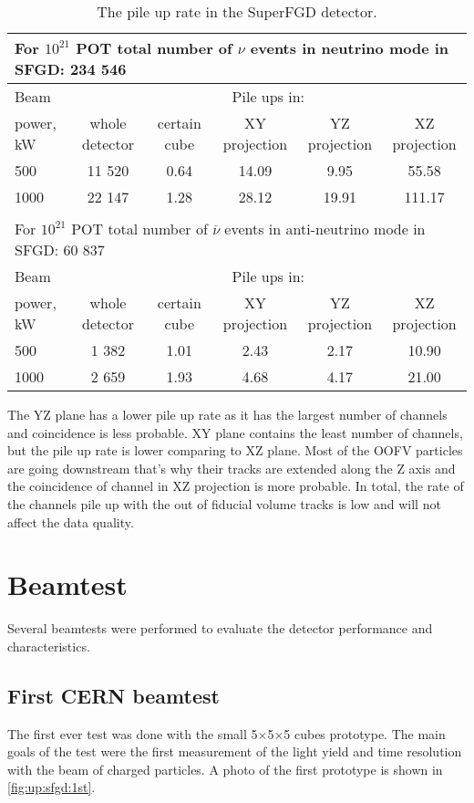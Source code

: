 \documentclass[main.tex]{subfiles}
\begin{document}
\begin{table}[!ht]
	\begin{tabular}{|l|ccccc|}
	\multicolumn{6}{l}{For $10^{21}$ POT total number of $\nu$ events in neutrino mode in  SFGD: 234 546} \\
	\hline
	Beam  					& \multicolumn{5}{c}{Pile ups in:} \\
	power, kW				& whole detector 	& certain cube 	& XY projection 	& YZ projection 	& XZ projection \\
	\hline
	500							& 11 520					& 0.64  				& 14.09					  & 9.95 						& 55.58 \\
	1000 						& 22 147 					& 1.28 					& 28.12 					& 19.91 					& 111.17 \\
	\hline
	\hline
	\multicolumn{6}{l}{} \\
	\multicolumn{6}{l}{For $10^{21}$ POT total number of $\overline{\nu}$ events in anti-neutrino mode in SFGD: 60 837} \\
	\hline
	Beam  					& \multicolumn{5}{c}{Pile ups in:} \\
	power, kW				& whole detector 	& certain cube 	& XY projection 	& YZ projection 	& XZ projection \\
	\hline
	500							&  1 382					& 1.01  				&  2.43					  & 2.17  					& 10.90 \\
	1000 						&  2 659 					& 1.93 					&  4.68 					& 4.17   					& 21.00 \\
	\hline
	\end{tabular}
	\caption{The pile up rate in the SuperFGD detector.}
	\label{tbl:up:sfgd:pile_up}
\end{table}

The YZ plane has a lower pile up rate as it has the largest number of channels and coincidence is less probable. XY plane contains the least number of channels, but the pile up rate is lower comparing to XZ plane. Most of the OOFV particles are going downstream that's why their tracks are extended along the Z axis and the coincidence of channel in XZ projection is more probable. In total, the rate of the channels pile up with the out of fiducial volume tracks is low and will not affect the data quality.

\section{Beamtest}
\label{sec:up:sfgd:beam}
Several beamtests were performed to evaluate the detector performance and characteristics.

\subsection{First CERN beamtest}
\label{sec:up:sfgd:beam1}
The first ever test was done with the small 5$\times$5$\times$5 cubes prototype. The main goals of the test were the first measurement of the light yield and time resolution with the beam of charged particles. A photo of the first prototype is shown in \autoref{fig:up:sfgd:1st}.
\end{document}
